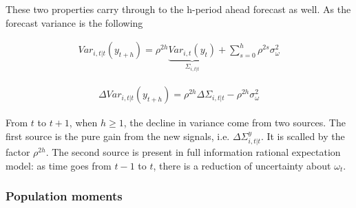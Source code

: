 \documentclass[]{article}
\begin{document}
\begin{enumerate}
These two properties carry through to the h-period ahead forecast as well. As the forecast variance is the following 

\begin{eqnarray}
Var_{i,t|t} (y_{t+h}) = \rho^{2h} \underbrace{Var_{i,t}(y_{t})}_{\Sigma_{i,t|t}} + \sum^{h}_{s=0}\rho^{2s} \sigma^2_{\omega}
\end{eqnarray}


\begin{eqnarray}
\Delta Var_{i,t|t} (y_{t+h}) = \rho^{2h}\Delta \Sigma_{i,t|t} - \rho^{2h} \sigma^2_{\omega}
\end{eqnarray}

From $t$ to $t+1$, when $h\geq 1$, the decline in variance come from two sources. The first source is the pure gain from the new signals, i.e. $\Delta \Sigma^y_{i,t|t}$. It is scalled by the factor $\rho^{2h}$. The second source is present in full information rational expectation model: as time goes from $t-1$ to $t$, there is a reduction of uncertainty about $\omega_t$.

\end{enumerate}

\subsubsection{Population moments}
\end{document}
